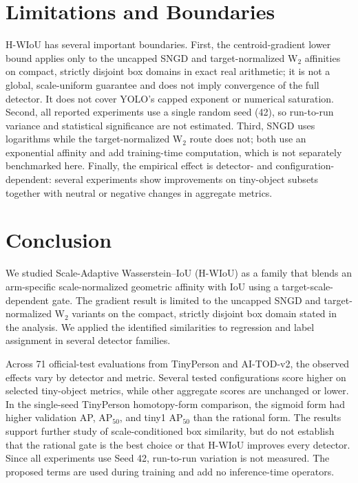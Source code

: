 \documentclass[11pt,a4paper]{article}
\begin{document}
\section{Limitations and Boundaries}
H-WIoU has several important boundaries. First, the centroid-gradient lower bound applies only to the uncapped SNGD and target-normalized W$_2$ affinities on compact, strictly disjoint box domains in exact real arithmetic; it is not a global, scale-uniform guarantee and does not imply convergence of the full detector. It does not cover YOLO's capped exponent or numerical saturation. Second, all reported experiments use a single random seed (42), so run-to-run variance and statistical significance are not estimated. Third, SNGD uses logarithms while the target-normalized W$_2$ route does not; both use an exponential affinity and add training-time computation, which is not separately benchmarked here. Finally, the empirical effect is detector- and configuration-dependent: several experiments show improvements on tiny-object subsets together with neutral or negative changes in aggregate metrics.


\section{Conclusion}
We studied Scale-Adaptive Wasserstein--IoU (H-WIoU) as a family that blends an arm-specific scale-normalized geometric affinity with IoU using a target-scale-dependent gate. The gradient result is limited to the uncapped SNGD and target-normalized W$_2$ variants on the compact, strictly disjoint box domain stated in the analysis. We applied the identified similarities to regression and label assignment in several detector families.

Across 71 official-test evaluations from TinyPerson and AI-TOD-v2, the observed effects vary by detector and metric. Several tested configurations score higher on selected tiny-object metrics, while other aggregate scores are unchanged or lower. In the single-seed TinyPerson homotopy-form comparison, the sigmoid form had higher validation AP, AP$_{50}$, and tiny1 AP$_{50}$ than the rational form. The results support further study of scale-conditioned box similarity, but do not establish that the rational gate is the best choice or that H-WIoU improves every detector. Since all experiments use Seed 42, run-to-run variation is not measured. The proposed terms are used during training and add no inference-time operators.
\end{document}
